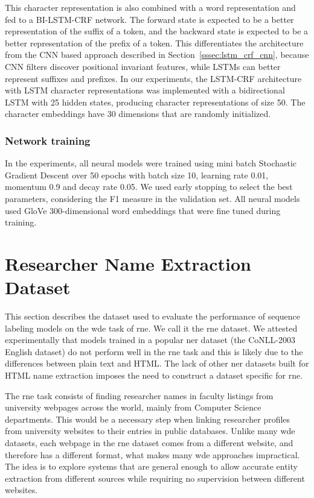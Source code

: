 \documentclass{nle}
\begin{document}
This character representation is also combined with a word 
representation and fed to a BI-LSTM-CRF network. 
The forward state is expected to be a better representation of the suffix of 
a token, and the backward state is expected to be a better representation of 
the prefix of a token. This differentiates the architecture
from the CNN based approach described in Section~\ref{sssec:lstm_crf_cnn}, because CNN filters 
discover positional invariant features, while LSTMs can better represent 
suffixes and prefixes. In our experiments, 
the LSTM-CRF architecture with LSTM character representations was implemented with a bidirectional 
LSTM with 25 hidden states, producing character representations of 
size 50. The character embeddings have 30 dimensions that are randomly initialized.

\subsubsection{Network training}

In the experiments, all neural models were trained using mini batch Stochastic Gradient Descent over 50 epochs with batch size 10,
learning rate 0.01, momentum 0.9 and decay rate 0.05. We used early stopping \cite{Caruana2000} to select the best 
parameters, considering the F1 measure in the validation set. All neural models used 
GloVe 300-dimensional word embeddings \cite{Pennington2014} that were fine tuned during training.


\section{Researcher Name Extraction Dataset}
\label{cha:dataset}

This section describes the dataset used to evaluate the performance of sequence labeling models
on the \gls{wde} task of \gls{rne}. We call it the \gls{rne} dataset.
We attested experimentally that 
models trained in a popular \gls{ner} dataset (the {CoNLL-2003} English dataset) do not perform 
well in the \gls{rne} task and this is likely due to the differences
between plain text and HTML. The lack of other \gls{ner} 
datasets built for HTML name extraction imposes the need to construct a dataset specific for \gls{rne}.

The \gls{rne} task consists of finding researcher names in faculty listings from university 
webpages across the world, mainly from Computer Science departments.
This would be a necessary step when linking researcher profiles from university 
websites to their entries in public databases. Unlike many
\gls{wde} datasets, each webpage in the \gls{rne} dataset comes from a different 
website, and therefore has a different format, what makes many \gls{wde}
approaches impractical. The idea is to explore systems that are general 
enough to allow accurate entity extraction from different sources while requiring
no supervision between different websites. 
\end{document}
